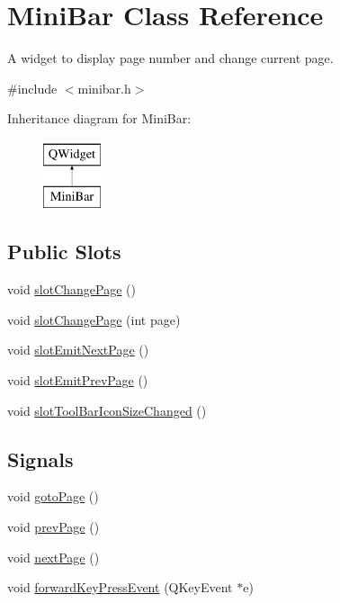 \hypertarget{classMiniBar}{\section{Mini\+Bar Class Reference}
\label{classMiniBar}
}


A widget to display page number and change current page.  




{\ttfamily \#include $<$minibar.\+h$>$}

Inheritance diagram for Mini\+Bar\+:\begin{figure}[H]
\begin{center}
\leavevmode
\includegraphics[height=2.000000cm]{classMiniBar}
\end{center}
\end{figure}
\subsection*{Public Slots}
\begin{DoxyCompactItemize}
\item 
void \hyperlink{classMiniBar_aa7f6df7b7c07163ee6f5881aaeef3859}{slot\+Change\+Page} ()
\item 
void \hyperlink{classMiniBar_aaa949576966820afab03f336d5e1880b}{slot\+Change\+Page} (int page)
\item 
void \hyperlink{classMiniBar_a72429bb47003b11b89b50b2c90ecd459}{slot\+Emit\+Next\+Page} ()
\item 
void \hyperlink{classMiniBar_a7150ff311d8560c4c1a9b9e18167ce57}{slot\+Emit\+Prev\+Page} ()
\item 
void \hyperlink{classMiniBar_a2d142654f341cead1f4495de5e2d43c8}{slot\+Tool\+Bar\+Icon\+Size\+Changed} ()
\end{DoxyCompactItemize}
\subsection*{Signals}
\begin{DoxyCompactItemize}
\item 
void \hyperlink{classMiniBar_a4f0f5d729fbe307f3340263061e50af2}{goto\+Page} ()
\item 
void \hyperlink{classMiniBar_ad8052f3639b48607d0b1cdf539eb092f}{prev\+Page} ()
\item 
void \hyperlink{classMiniBar_a31fd3c4b7b604c65be9222fe1cec11f7}{next\+Page} ()
\item 
void \hyperlink{classMiniBar_abc05e1ff3da3e6f23a3c68db5242f449}{forward\+Key\+Press\+Event} (Q\+Key\+Event $\ast$e)
\end{DoxyCompactItemize}
